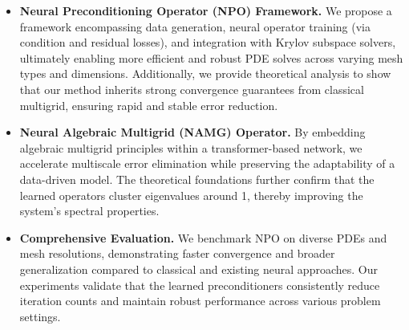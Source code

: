 \begin{itemize}
    \item \textbf{Neural Preconditioning Operator (NPO) Framework.} We propose a framework encompassing data generation, neural operator training (via condition and residual losses), and integration with Krylov subspace solvers, ultimately enabling more efficient and robust PDE solves across varying mesh types and dimensions. Additionally, we provide theoretical analysis to show that our method inherits strong convergence guarantees from classical multigrid, ensuring rapid and stable error reduction.

    \item \textbf{Neural Algebraic Multigrid (NAMG) Operator.} By embedding algebraic multigrid principles within a transformer-based network, we accelerate multiscale error elimination while preserving the adaptability of a data-driven model. The theoretical foundations further confirm that the learned operators cluster eigenvalues around 1, thereby improving the system’s spectral properties.

    \item \textbf{Comprehensive Evaluation.} We benchmark NPO on diverse PDEs and mesh resolutions, demonstrating faster convergence and broader generalization compared to classical and existing neural approaches. Our experiments validate that the learned preconditioners consistently reduce iteration counts and maintain robust performance across various problem settings.
\end{itemize}
